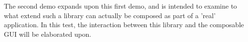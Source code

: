 The second demo expands upon this first demo, and is intended to examine to what extend such a library can actually be composed as part of a 'real' application. 
In this test, the interaction between this library and the composable \ac{GUI} will be elaborated upon.







